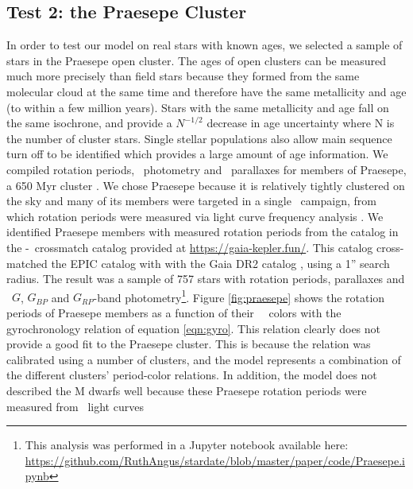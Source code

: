 \subsection{Test 2: the Praesepe Cluster}
In order to test our model on real stars with known ages, we selected a sample
of stars in the Praesepe open cluster.
The ages of open clusters can be measured much more precisely than field stars
because they formed from the same molecular cloud at the same time and
therefore have the same metallicity and age (to within a few million years).
Stars with the same metallicity and age fall on the same isochrone, and
provide a $N^{-1/2}$ decrease in age uncertainty where N is the number of
cluster stars.
Single stellar populations also allow main sequence turn off to be identified
which provides a large amount of age information.
We compiled rotation periods, \Gaia\ photometry and \gaia\ parallaxes for
members of Praesepe, a 650 Myr cluster \citep{fossati2008}.
We chose Praesepe because it is relatively tightly clustered on the sky and
many of its members were targeted in a single \ktwo\ campaign, from which
rotation periods were measured via light curve frequency analysis
\citep{douglas2017, rebull2017}.
We identified Praesepe members with measured rotation periods from the
\citet{douglas2017} catalog in the \ktwo-\gaia\ crossmatch catalog provided at
\url{https://gaia-kepler.fun/}.
This catalog cross-matched the EPIC catalog \citep{huber2016} with with the
Gaia DR2 catalog \citep{brown2018}, using a 1'' search radius.
The result was a sample of 757 stars with rotation periods, parallaxes and
\gaia\ $G$, $G_{BP}$ and $G_{RP}$-band photometry\footnote{This analysis was
performed in a Jupyter notebook available here:
\url{
https://github.com/RuthAngus/stardate/blob/master/paper/code/Praesepe.ipynb}}.
Figure \ref{fig:praesepe} shows the rotation periods of Praesepe members as a
function of their \gaia\ \gcolor\ colors with the gyrochronology relation of
equation \ref{eqn:gyro}.
This relation clearly does not provide a good fit to the Praesepe cluster.
This is because the relation was calibrated using a number of clusters, and
the model represents a combination of the different clusters' period-color
relations.
In addition, the model does not described the M dwarfs well because these
Praesepe rotation periods were measured from \ktwo\ light curves
